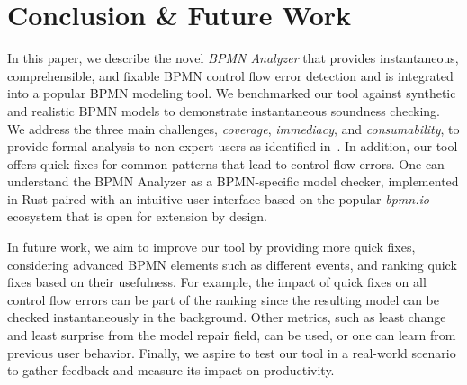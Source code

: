 \documentclass[
onecolumn, %
]{ceurart}
\begin{document}
\section{Conclusion \& Future Work} \label{sec:conclusion}

In this paper, we describe the novel \textit{BPMN Analyzer} that provides instantaneous, comprehensible, and fixable BPMN control flow error detection and is integrated into a popular BPMN modeling tool.
We benchmarked our tool against synthetic and realistic BPMN models to demonstrate instantaneous soundness checking.
We address the three main challenges, \textit{coverage}, \textit{immediacy}, and \textit{consumability}, to provide formal analysis to non-expert users as identified in~\cite{fahlandAnalysisDemandInstantaneous2011}.
In addition, our tool offers quick fixes for common patterns that lead to control flow errors.
One can understand the BPMN Analyzer as a BPMN-specific model checker, implemented in Rust paired with an intuitive user interface based on the popular \textit{bpmn.io} ecosystem that is open for extension by design.

In future work, we aim to improve our tool by providing more quick fixes, considering advanced BPMN elements such as different events, and ranking quick fixes based on their usefulness.
For example, the impact of quick fixes on all control flow errors can be part of the ranking since the resulting model can be checked instantaneously in the background.
Other metrics, such as least change and least surprise from the model repair field, can be used, or one can learn from previous user behavior.
Finally, we aspire to test our tool in a real-world scenario to gather feedback and measure its impact on productivity.



\end{document}
